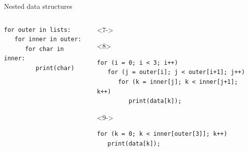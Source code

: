 \documentclass[aspectratio=169]{beamer}
\begin{document}
\begin{frame}[fragile]{Nested data structures}
\begin{columns}[t]
\begin{uncoverenv}
\vspace{-0.25 cm}
\small
\begin{verbatim}
for outer in lists:
   for inner in outer:
      for char in inner:
         print(char)
\end{verbatim}
\end{uncoverenv}

\begin{uncoverenv}<7->
\mbox{\hspace{-0.1 cm}}


\small
\vspace{-0.25 cm}
\begin{onlyenv}<8>
\begin{verbatim}
for (i = 0; i < 3; i++)
   for (j = outer[i]; j < outer[i+1]; j++)
      for (k = inner[j]; k < inner[j+1]; k++)
         print(data[k]);
\end{verbatim}
\end{onlyenv}
\begin{onlyenv}<9->
\begin{verbatim}
for (k = 0; k < inner[outer[3]]; k++)
   print(data[k]);
\end{verbatim}
\end{onlyenv}
\end{uncoverenv}
\end{columns}
\end{frame}
\end{document}
